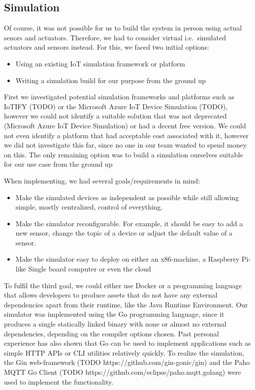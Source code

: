 \subsection{Simulation}\label{subsec:simulation}

Of course, it was not possible for us to build the system in person
using actual senors and actuators.
Therefore, we had to consider virtual
i.e.~simulated actuators and sensors instead.
For this, we faced two
initial options:
\begin{itemize}
    \item Using an existing IoT simulation framework or platform
    \item Writing a simulation build for our purpose from the ground up
\end{itemize}

First we investigated potential simulation frameworks and platforms such
as IoTIFY (TODO) or the Microsoft Azure IoT Device Simulation (TODO), however we could
not identify a suitable solution that was not deprecated (Microsoft
Azure IoT Device Simulation) or had a decent free version.
We could not
even identify a platform that had acceptable cost associated with it,
however we did not investigate this far, since no one in our team wanted
to spend money on this.
The only remaining option was to build a
simulation ourselves suitable for our use case from the ground up

When implementing, we had several goals/requirements in mind:

\begin{itemize}
    \item
    Make the simulated devices as independent as possible while still
    allowing simple, mostly centralized, control of everything.
    \item
    Make the simulator reconfigurable.
    For example, it should be easy to
    add a new sensor, change the topic of a device or adjust the default
    value of a sensor.
    \item
    Make the simulator easy to deploy on either an x86-machine, a
    Raspberry Pi-like Single board computer or even the cloud
\end{itemize}

To fulfil the third goal, we could either use Docker or a programming
language that allows developers to produce assets that do not have any
external dependencies apart from their runtime, like the Java Runtime
Environment.
Our simulator was implemented using the Go programming
language, since it produces a single statically linked binary with none
or almost no external dependencies, depending on the compiler options
chosen.
Past personal experience has also shown that Go can be used to
implement applications such as simple HTTP APIs or CLI utilities
relatively quickly.
To realize the simulation, the Gin web-framework
(TODO https://github.com/gin-gonic/gin) and the Paho MQTT Go Client
(TODO https://github.com/eclipse/paho.mqtt.golang) were used to implement the
functionality.

